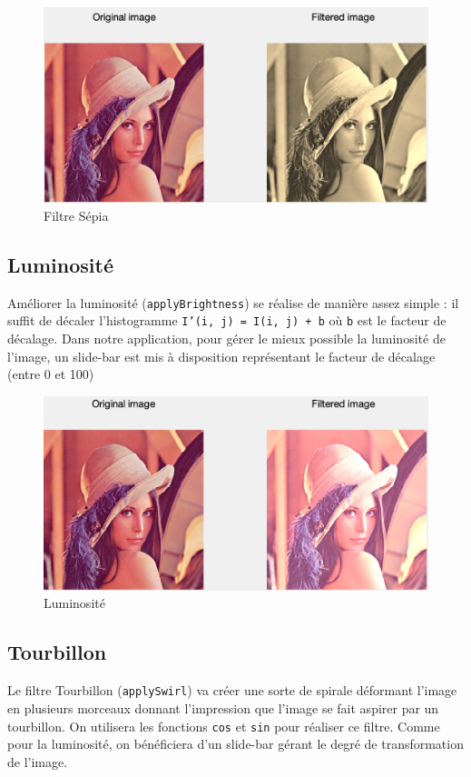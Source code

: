 \documentclass[12pt,a4paper]{article}
\begin{document}
\begin{figure}[H]
\centering
\includegraphics[scale=0.5]{img/sepia}
\caption{Filtre Sépia}
\end{figure}

\subsection{Luminosité}
Améliorer la luminosité (\texttt{applyBrightness}) se réalise de manière assez simple : il suffit de décaler l'histogramme \texttt{I'(i, j) = I(i, j) + b} où \texttt{b} est le facteur de décalage. Dans notre application, pour gérer le mieux possible la luminosité de l'image, un slide-bar est mis à disposition représentant le facteur de décalage (entre 0 et 100)

\begin{figure}[H]
\centering
\includegraphics[scale=0.5]{img/brightness}
\caption{Luminosité}
\end{figure}

\subsection{Tourbillon}
Le filtre Tourbillon (\texttt{applySwirl}) va créer une sorte de spirale déformant l'image en plusieurs morceaux donnant l'impression que l'image se fait aspirer par un tourbillon. On utilisera les fonctions \texttt{cos} et \texttt{sin} pour réaliser ce filtre. Comme pour la luminosité, on bénéficiera d'un slide-bar gérant le degré de transformation de l'image.
\end{document}
